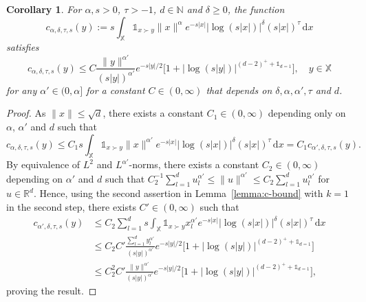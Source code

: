 \documentclass[11pt,reqno]{amsart}
\numberwithin{equation}{section}
\newtheorem{corollary}[theorem]{Corollary}
\theoremstyle{definition}
\newcommand{\R}{\mathbb{R}}
\newcommand{\N}{\mathbb{N}}
\newcommand{\XX}{\mathbb{X}}
\newcommand{\diff}{{\,\mathrm d}}
\begin{document}
\begin{corollary}	\label{cor:c-bound}
	For $\alpha, s>0$, $\tau>-1$, $d \in \N$ and $\delta \ge 0$, the function
	\begin{equation}\label{eq:barc}
		c_{\alpha,\delta,\tau,s} (y):=s\int_{\XX} \mathds{1}_{x\succ y} \|x\|^\alpha
		e^{-s |x|} \big|\log (s |x|) \big|^\delta (s|x|)^\tau \diff x
	\end{equation}
satisfies
\begin{equation*}
	c_{\alpha,\delta,\tau,s}(y)\leq C
	\frac{\|y\|^{\alpha'}}{(s|y|)^{\alpha'}} e^{-s|y|/2}\Big[1+\big|\log(s|y|)\big|^{(d-2)^+ + \mathds{1}_{d=1}}\Big], \quad y \in \XX
\end{equation*}
for any $\alpha' \in (0,\alpha]$ for a constant $C \in (0,\infty)$ that depends on $\delta,\alpha, \alpha', \tau$ and $d$.
\end{corollary}
\begin{proof}
	As $\|x\| \le \sqrt{d}$, there exists a constant $C_1 \in (0,\infty)$ depending only on $\alpha$, $\alpha'$ and $d$ such that
	$$
	c_{\alpha,\delta,\tau,s}(y) \le C_1 s\int_\XX \mathds{1}_{x \succ y} \|x\|^{\alpha'} e^{-s|x|}\big|\log (s |x|) \big|^\delta (s |x|)^\tau \diff x= C_1 c_{\alpha',\delta,\tau,s}(y). 
	$$
	By equivalence of $L^2$ and $L^{\alpha'}$-norms, there exists a constant $C_2 \in (0,\infty)$ depending on $\alpha'$ and $d$ such that $C_2^{-1}\sum_{l=1}^d u_l^{\alpha'} \le  \|u\|^{\alpha'}  \le C_2 \sum_{l=1}^d u_l^{\alpha'}$ for $u \in \R^d$. Hence, using the second assertion in Lemma~\ref{lemma:c-bound} with $k=1$ in the second step, there exists $C' \in (0,\infty)$ such that
	\begin{align*}
	c_{\alpha',\delta,\tau,s}(y) &\le C_2 \sum_{l=1}^d s\int_\XX \mathds{1}_{x \succ y} x_l^{\alpha'} e^{-s|x|}\big|\log (s |x|) \big|^\delta (s |x|)^\tau \diff x\\
	& \le C_2C' \frac{\sum_{l=1}^d y_l^{\alpha'}}{(s|y|)^{\alpha'}} e^{-s|y|/2}\Big[1+\big|\log(s|y|)\big|^{(d-2)^+ + \mathds{1}_{d=1}}\Big] \\
	&\le C_2^2 C' \frac{\|y\|^{\alpha'}}{(s|y|)^{\alpha'}} e^{-s|y|/2}\Big[1+\big|\log(s|y|)\big|^{(d-2)^+ + \mathds{1}_{d=1}}\Big],
	\end{align*}
proving the result.
\end{proof}
\end{document}
